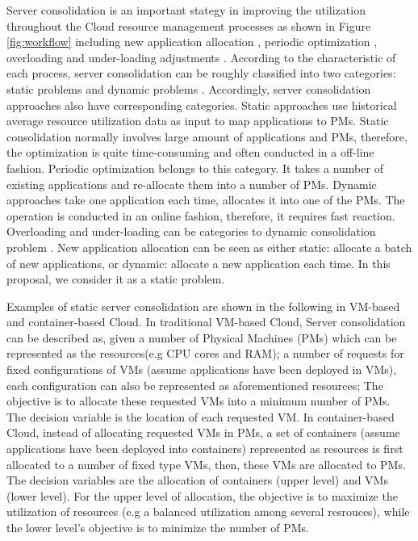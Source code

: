 Server consolidation is an important stategy in improving the utilization throughout the Cloud resource management processes as shown in Figure \ref{fig:workflow} including new application allocation \cite{Jennings:2015ht}, periodic optimization \cite{Mishra:2012kx}, overloading and under-loading adjustments \cite{Mishra:2012kx}. According to the characteristic of each process, server consolidation can be roughly classified into two categories: static problems \cite{Mishra:2012kx} and dynamic problems \cite{Beloglazov:2012bw}.
Accordingly, server consolidation approaches also have corresponding categories. Static approaches use historical average resource utilization data as input to map applications to PMs. Static consolidation normally involves large amount of applications and PMs, therefore, the optimization is quite time-consuming and often conducted in a off-line fashion. Periodic optimization belongs to this category. It takes a number of existing applications and re-allocate them into a number of PMs. 
Dynamic approaches take one application each time, allocates it into one of the PMs. The operation is conducted in an online fashion, therefore, it requires fast reaction. Overloading  and under-loading can be categories to dynamic consolidation problem \cite{Beloglazov:2013ht}. New application allocation can be seen as either static: allocate a batch of new applications, or dynamic: allocate a new application each time. In this proposal, we consider it as a static problem. 

Examples of static server consolidation are shown in the following in VM-based and container-based Cloud. In traditional VM-based Cloud, Server consolidation can be described as, given a number of Physical Machines (PMs) which can be represented as the resources(e.g CPU cores and RAM); a number of requests for fixed configurations of VMs (assume applications have been deployed in VMs), each configuration can also be represented as aforementioned resources; The objective is to allocate these requested VMs into a minimum number of PMs. The decision variable is the location of each requested VM. In container-based Cloud, instead of allocating requested VMs in PMs, a set of containers (assume applications have been deployed into containers) represented as resources is first allocated to a number of fixed type VMs, then, these VMs are allocated to PMs. The decision variables are the allocation of containers (upper level) and VMs (lower level). For the upper level of allocation, the objective is to maximize the utilization of resources (e.g a balanced utilization among several resrouces), while the lower level's objective is to minimize the number of PMs.

